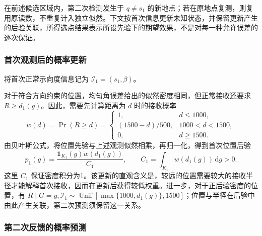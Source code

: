 在前述候选区域内，第二次检测发生于 \(q\ne s_1\) 的新地点；若在原地点复测，则复用原读数，不重复计入独立似然。下文按首次信息更新未知状态，并保留更新产生的后验关联，所得选点结果表示所设先验下的期望效果，不是对每一种允许误差的逐次保证。

\subsubsection{首次观测后的概率更新}

将首次正常示向度信息记为 \(\mathcal I_1=(s_1,\beta)\)。

对于符合方向约束的位置，均匀角误差给出的似然密度相同，但正常接收还要求 \(R\ge d_1(g)\)。因此，需要先计算距离为 \(d\) 时的接收概率
\begin{equation}
 w(d)=\Pr(R\ge d)=
 \begin{cases}
 1,&d\le1000,\\
 (1500-d)/500,&1000<d<1500,\\
 0,&d\ge1500.
 \end{cases}
\label{eq:q2-pair-weight}
\end{equation}
由贝叶斯公式，将位置先验与上述观测似然相乘，再归一化，得到首次位置后验
\begin{equation}
 p_1(g)=\frac{\mathbf1_{K_1}(g)w(d_1(g))}{C_1},
 \qquad C_1=\int_{K_1}w(d_1(g))\,\mathrm dg>0.
\label{eq:q2-pair-posterior}
\end{equation}
这里 \(C_1\) 保证密度积分为1。该更新的直观含义是，较远的位置需要较大的接收半径才能解释首次接收，因而在更新后获得较低权重。进一步，对于正后验密度的位置，有 \(R\mid G=g,\mathcal I_1\sim\operatorname{Unif}[\max\{1000,d_1(g)\},1500]\)；位置与半径在后验中由此产生关联，第二次预测须保留这一关系。

\subsubsection{第二次反馈的概率预测}

